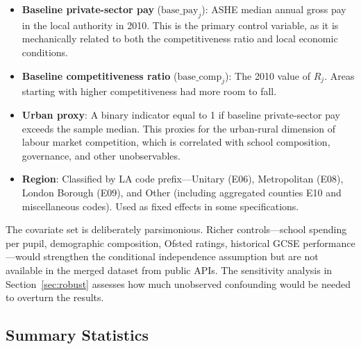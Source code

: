 \documentclass[12pt]{article}
\begin{document}
\begin{itemize}
    \item \textbf{Baseline private-sector pay} ($\text{base\_pay}_j$): ASHE median annual gross pay in the local authority in 2010. This is the primary control variable, as it is mechanically related to both the competitiveness ratio and local economic conditions.
    \item \textbf{Baseline competitiveness ratio} ($\text{base\_comp}_j$): The 2010 value of $R_j$. Areas starting with higher competitiveness had more room to fall.
    \item \textbf{Urban proxy}: A binary indicator equal to 1 if baseline private-sector pay exceeds the sample median. This proxies for the urban-rural dimension of labour market competition, which is correlated with school composition, governance, and other unobservables.
    \item \textbf{Region}: Classified by LA code prefix---Unitary (E06), Metropolitan (E08), London Borough (E09), and Other (including aggregated counties E10 and miscellaneous codes). Used as fixed effects in some specifications.
\end{itemize}

The covariate set is deliberately parsimonious. Richer controls---school spending per pupil, demographic composition, Ofsted ratings, historical GCSE performance---would strengthen the conditional independence assumption but are not available in the merged dataset from public APIs. The sensitivity analysis in Section~\ref{sec:robust} assesses how much unobserved confounding would be needed to overturn the results.

\subsection{Summary Statistics}
\end{document}
